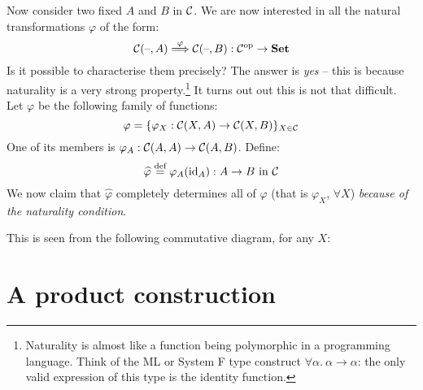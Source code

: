 Now consider two fixed $A$ and $B$ in $\mathcal{C}$. We are now interested in all
the natural transformations $\varphi$ of the form:
\[ \mathcal{C}(\text{--}, A) \overset{\varphi}{\Longrightarrow} \mathcal{C}(\text{--}, B) :
{\mathcal{C}}^{\mathrm{op}} \to \mathbf {Set} \]
Is it possible to characterise them precisely? The answer is \emph{yes} -- this
is because naturality is a very strong property.\footnote{Naturality is almost
like a function being polymorphic in a programming language. Think of the ML
or System F type construct $\forall \alpha.\ \alpha \to \alpha$: the only valid
expression of this type is the identity function.} It turns out out this is not
that difficult. Let $\varphi$ be the following family of functions:
\[ \varphi = \{ \varphi_X: \mathcal{C} (X, A) \to
\mathcal{C} (X, B) \}_{X \in \mathcal{C}} \]
One of its members is $\varphi_A: \mathcal{C} (A, A) \to \mathcal{C} (A, B)$. Define:
\[ \widehat{\varphi} \stackrel{\text{def}}{=} \varphi_A (\mathrm{id}_{ A }) : A \to B \text{ in } \mathcal{C} \]
We now claim that $\widehat{\varphi}$ completely determines all of $\varphi$
(that is $\varphi_X$, $\forall X$) \emph{because of the naturality condition}.

This is seen from the following commutative diagram, for any $X$:

\begin{center}
\end{center}

\section{A product construction}


